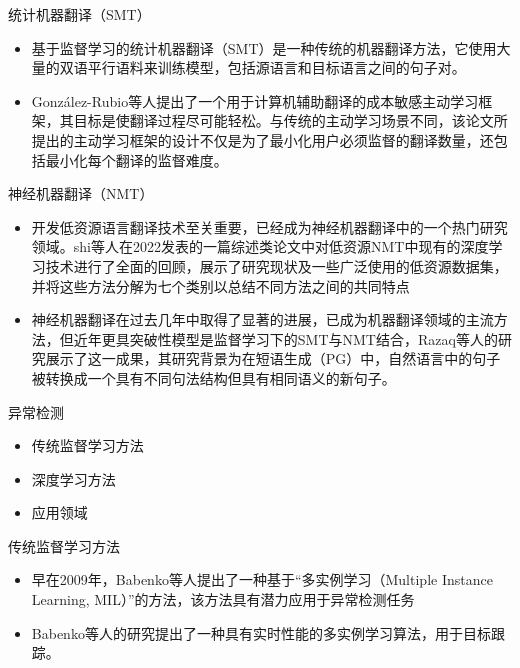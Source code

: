 \documentclass[UTF8,AutoFakeBold,AutoFakeSlant]{beamer}
\begin{document}
\begin{frame}{统计机器翻译（SMT）}
    \begin{itemize}
        \item 基于监督学习的统计机器翻译（SMT）是一种传统的机器翻译方法，它使用大量的双语平行语料来训练模型，包括源语言和目标语言之间的句子对。
        \item González-Rubio等人提出了一个用于计算机辅助翻译的成本敏感主动学习框架，其目标是使翻译过程尽可能轻松。与传统的主动学习场景不同，该论文所提出的主动学习框架的设计不仅是为了最小化用户必须监督的翻译数量，还包括最小化每个翻译的监督难度。
    \end{itemize}
\end{frame}

\begin{frame}{神经机器翻译（NMT）}
    \scriptsize
    \begin{itemize}
        \item 开发低资源语言翻译技术至关重要，已经成为神经机器翻译中的一个热门研究领域。shi等人在2022发表的一篇综述类论文中对低资源NMT中现有的深度学习技术进行了全面的回顾，展示了研究现状及一些广泛使用的低资源数据集，并将这些方法分解为七个类别以总结不同方法之间的共同特点
        \item 神经机器翻译在过去几年中取得了显著的进展，已成为机器翻译领域的主流方法，但近年更具突破性模型是监督学习下的SMT与NMT结合，Razaq等人的研究展示了这一成果，其研究背景为在短语生成（PG）中，自然语言中的句子被转换成一个具有不同句法结构但具有相同语义的新句子。
    \end{itemize}
\end{frame}

\begin{frame}{异常检测}
    \begin{itemize}
        \item 传统监督学习方法
        \item 深度学习方法
        \item 应用领域
    \end{itemize}
\end{frame}

\begin{frame}{传统监督学习方法}
    \begin{itemize}
        \item 早在2009年，Babenko等人提出了一种基于“多实例学习（Multiple Instance Learning, MIL）”的方法，该方法具有潜力应用于异常检测任务
        \item Babenko等人的研究提出了一种具有实时性能的多实例学习算法，用于目标跟踪。
    \end{itemize}
\end{frame}
\end{document}
